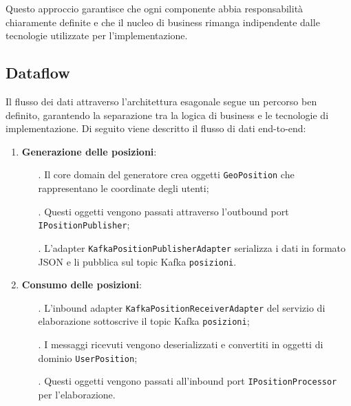 \documentclass[10pt]{article}
\begin{document}
    Questo approccio garantisce che ogni componente abbia responsabilità chiaramente definite e che il nucleo di business rimanga indipendente dalle tecnologie utilizzate per l'implementazione.

    \subsection{Dataflow}
    
    Il flusso dei dati attraverso l'architettura esagonale segue un percorso ben definito, garantendo la separazione tra la logica di business e le tecnologie di implementazione. Di seguito viene descritto il flusso di dati end-to-end:
    
    \begin{enumerate}
        \item \textbf{Generazione delle posizioni}:
        \begin{itemize}
            \item[.] Il core domain del generatore crea oggetti \texttt{GeoPosition} che rappresentano le coordinate degli utenti;
            \item[.] Questi oggetti vengono passati attraverso l'outbound port \texttt{IPositionPublisher};
            \item[.] L'adapter \texttt{KafkaPositionPublisherAdapter} serializza i dati in formato JSON e li pubblica sul topic Kafka \texttt{posizioni}.
        \end{itemize}
        
        \item \textbf{Consumo delle posizioni}:
        \begin{itemize}
            \item[.] L'inbound adapter \texttt{KafkaPositionReceiverAdapter} del servizio di elaborazione sottoscrive il topic Kafka \texttt{posizioni};
            \item[.] I messaggi ricevuti vengono deserializzati e convertiti in oggetti di dominio \texttt{UserPosition};
            \item[.] Questi oggetti vengono passati all'inbound port \texttt{IPositionProcessor} per l'elaborazione.
        \end{itemize}
        

\end{enumerate}
\end{document}
